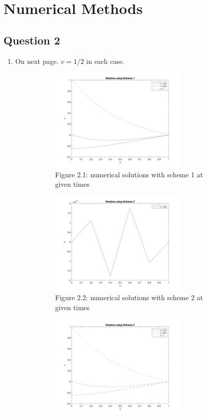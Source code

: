 \documentclass[a4paper,11pt]{article}
\begin{document}
\section{Numerical Methods}
\subsection*{Question 2}
\begin{enumerate}[label = (\roman*)]
 \item
 On next page. $v = 1/2$ in each case.
 \newpage
\begin{figure}[H]
\begin{subfigure}{0.5\textwidth}
\includegraphics[width = \linewidth, height = 5cm]{Q2(1).jpg}
\caption{Figure 2.1: numerical solutions with scheme 1 at given times}
\label{Q2(1)}
\end{subfigure}
\begin{subfigure}{0.5\textwidth}
\includegraphics[width = \linewidth, height = 5cm]{Q2(2).jpg}
\caption{Figure 2.2: numerical solutions with scheme 2 at given times}
\label{Q2(2)}
\end{subfigure}
\begin{subfigure}{0.5\textwidth}
\includegraphics[width = \linewidth, height = 5cm]{Q2(3).jpg}

\end{subfigure}
\end{figure}
\end{enumerate}
\end{document}
